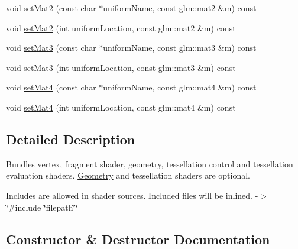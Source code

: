 \textbf{ }\par
\begin{DoxyCompactItemize}
\item 
void \mbox{\hyperlink{classec_1_1_shader_a47782ae05dace705129f12b9feec03ce}{set\+Mat2}} (const char $\ast$uniform\+Name, const glm\+::mat2 \&m) const
\item 
void \mbox{\hyperlink{classec_1_1_shader_a6b2ee27e91d3f4f9465008df1aad4366}{set\+Mat2}} (int uniform\+Location, const glm\+::mat2 \&m) const
\end{DoxyCompactItemize}

\textbf{ }\par
\begin{DoxyCompactItemize}
\item 
void \mbox{\hyperlink{classec_1_1_shader_abb9b4a0e149edcba5ad255f2393b52bf}{set\+Mat3}} (const char $\ast$uniform\+Name, const glm\+::mat3 \&m) const
\item 
void \mbox{\hyperlink{classec_1_1_shader_a134b5b5da07fba23324b1035d3b246cb}{set\+Mat3}} (int uniform\+Location, const glm\+::mat3 \&m) const
\end{DoxyCompactItemize}

\textbf{ }\par
\begin{DoxyCompactItemize}
\item 
void \mbox{\hyperlink{classec_1_1_shader_a2aae545a7c6999a1e27d376e02be5fe4}{set\+Mat4}} (const char $\ast$uniform\+Name, const glm\+::mat4 \&m) const
\item 
void \mbox{\hyperlink{classec_1_1_shader_a70b14375c038b9814fe16b8e3ea92a13}{set\+Mat4}} (int uniform\+Location, const glm\+::mat4 \&m) const
\end{DoxyCompactItemize}



\subsection{Detailed Description}
Bundles vertex, fragment shader, geometry, tessellation control and tessellation evaluation shaders. \mbox{\hyperlink{classec_1_1_geometry}{Geometry}} and tessellation shaders are optional.

Includes are allowed in shader sources. Included files will be inlined. -\/$>$ \char`\"{}\#include \char`\"{}filepath\char`\"{}\char`\"{} 

\subsection{Constructor \& Destructor Documentation}
\mbox{\label{classec_1_1_shader_a3a564a98ae49d2c050dc2221d56d54ca}} 
